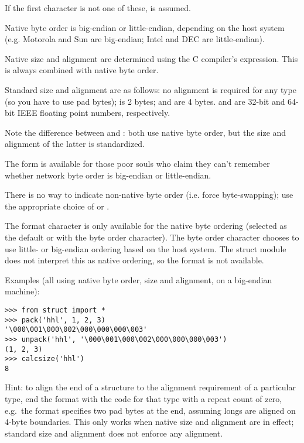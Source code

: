 If the first character is not one of these,  is assumed.

Native byte order is big-endian or little-endian, depending on the
host system (e.g. Motorola and Sun are big-endian; Intel and DEC are
little-endian).

Native size and alignment are determined using the C compiler's
 expression.  This is always combined with native byte
order.

Standard size and alignment are as follows: no alignment is required
for any type (so you have to use pad bytes);  is 2 bytes;
 and  are 4 bytes.   and
 are 32-bit and 64-bit IEEE floating point numbers,
respectively.

Note the difference between  and \character{=}: both use
native byte order, but the size and alignment of the latter is
standardized.

The form \character{!} is available for those poor souls who claim they
can't remember whether network byte order is big-endian or
little-endian.

There is no way to indicate non-native byte order (i.e. force
byte-swapping); use the appropriate choice of \character{<} or
\character{>}.

The  format character is only available for the native
byte ordering (selected as the default or with the  byte
order character). The byte order character \character{=} chooses to
use little- or big-endian ordering based on the host system. The
struct module does not interpret this as native ordering, so the
 format is not available.

Examples (all using native byte order, size and alignment, on a
big-endian machine):

\begin{verbatim}
>>> from struct import *
>>> pack('hhl', 1, 2, 3)
'\000\001\000\002\000\000\000\003'
>>> unpack('hhl', '\000\001\000\002\000\000\000\003')
(1, 2, 3)
>>> calcsize('hhl')
8
\end{verbatim}

Hint: to align the end of a structure to the alignment requirement of
a particular type, end the format with the code for that type with a
repeat count of zero, e.g.\ the format  specifies two
pad bytes at the end, assuming longs are aligned on 4-byte boundaries.
This only works when native size and alignment are in effect;
standard size and alignment does not enforce any alignment.

\begin{seealso}
\end{seealso}
